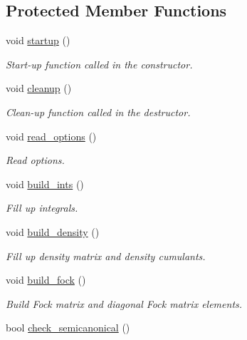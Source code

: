 \subsection*{Protected Member Functions}
\begin{DoxyCompactItemize}
\item 
void \mbox{\hyperlink{classforte_1_1_d_s_r_g___m_r_p_t_ab043c2526c08fa3d80f336b44f215a9f}{startup}} ()
\begin{DoxyCompactList}\small\item\em Start-\/up function called in the constructor. \end{DoxyCompactList}\item 
void \mbox{\hyperlink{classforte_1_1_d_s_r_g___m_r_p_t_a3b1e40388dd518ed9117b7f625cebf42}{cleanup}} ()
\begin{DoxyCompactList}\small\item\em Clean-\/up function called in the destructor. \end{DoxyCompactList}\item 
void \mbox{\hyperlink{classforte_1_1_d_s_r_g___m_r_p_t_a089de562b9ee02dffee27888e12c8397}{read\+\_\+options}} ()
\begin{DoxyCompactList}\small\item\em Read options. \end{DoxyCompactList}\item 
void \mbox{\hyperlink{classforte_1_1_d_s_r_g___m_r_p_t_a1fd1ad6aab74b00db95f4fb10367440d}{build\+\_\+ints}} ()
\begin{DoxyCompactList}\small\item\em Fill up integrals. \end{DoxyCompactList}\item 
void \mbox{\hyperlink{classforte_1_1_d_s_r_g___m_r_p_t_a2f9ab7b9cc446d8b2a0cd4cb99cd4a1a}{build\+\_\+density}} ()
\begin{DoxyCompactList}\small\item\em Fill up density matrix and density cumulants. \end{DoxyCompactList}\item 
void \mbox{\hyperlink{classforte_1_1_d_s_r_g___m_r_p_t_ac004a876996743cc7dbe8842c84e6102}{build\+\_\+fock}} ()
\begin{DoxyCompactList}\small\item\em Build Fock matrix and diagonal Fock matrix elements. \end{DoxyCompactList}\item 
bool \mbox{\hyperlink{classforte_1_1_d_s_r_g___m_r_p_t_a6de4974590a59995537d42b2188f4d02}{check\+\_\+semicanonical}} ()

\end{DoxyCompactItemize}
